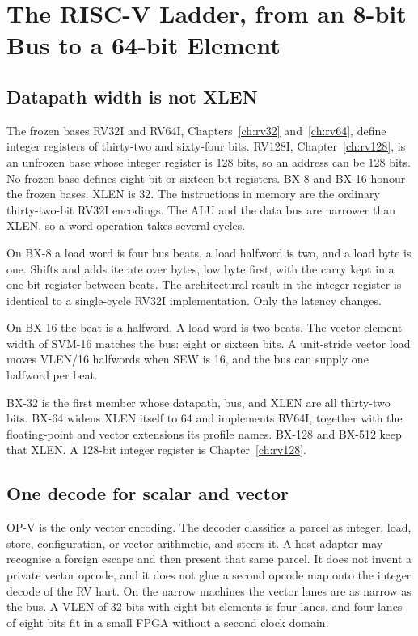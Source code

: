 \chapter{The RISC-V Ladder, from an 8-bit Bus to a 64-bit Element}

\section{Datapath width is not XLEN}

The frozen bases RV32I and RV64I, Chapters~\ref{ch:rv32} and~\ref{ch:rv64}, define integer registers of thirty-two and sixty-four bits. RV128I, Chapter~\ref{ch:rv128}, is an unfrozen base whose integer register is 128 bits, so an address can be 128 bits. No frozen base defines eight-bit or sixteen-bit registers. BX-8 and BX-16 honour the frozen bases. XLEN is 32. The instructions in memory are the ordinary thirty-two-bit RV32I encodings. The ALU and the data bus are narrower than XLEN, so a word operation takes several cycles.

On BX-8 a load word is four bus beats, a load halfword is two, and a load byte is one. Shifts and adds iterate over bytes, low byte first, with the carry kept in a one-bit register between beats. The architectural result in the integer register is identical to a single-cycle RV32I implementation. Only the latency changes.

On BX-16 the beat is a halfword. A load word is two beats. The vector element width of SVM-16 matches the bus: eight or sixteen bits. A unit-stride vector load moves VLEN/16 halfwords when SEW is 16, and the bus can supply one halfword per beat.

BX-32 is the first member whose datapath, bus, and XLEN are all thirty-two bits. BX-64 widens XLEN itself to 64 and implements RV64I, together with the floating-point and vector extensions its profile names. BX-128 and BX-512 keep that XLEN. A 128-bit integer register is Chapter~\ref{ch:rv128}.

\section{One decode for scalar and vector}

OP-V is the only vector encoding. The decoder classifies a parcel as integer, load, store, configuration, or vector arithmetic, and steers it. A host adaptor may recognise a foreign escape and then present that same parcel. It does not invent a private vector opcode, and it does not glue a second opcode map onto the integer decode of the RV hart. On the narrow machines the vector lanes are as narrow as the bus. A VLEN of 32 bits with eight-bit elements is four lanes, and four lanes of eight bits fit in a small FPGA without a second clock domain.

